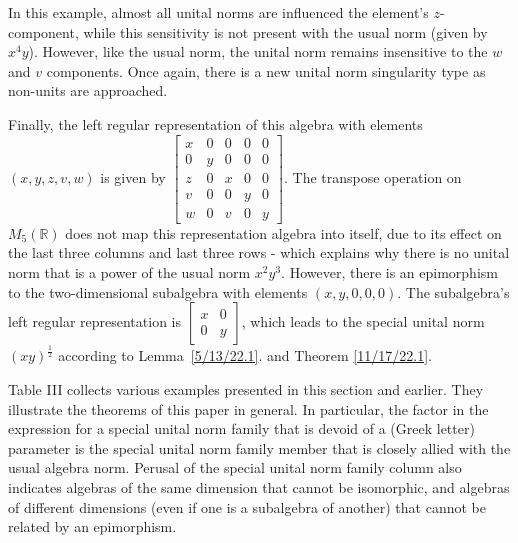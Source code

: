 \documentclass{amsart}
\numberwithin{equation}{section}
\theoremstyle{definition}
\numberwithin{theorem}{section}
\begin{document}
In this example, almost all unital norms are influenced the element's $z$-component, while this sensitivity is not present with the usual norm (given by $x^4y$).  However, like the usual norm,  the unital norm remains insensitive to the $w$ and $v$ components.  Once again, there is a new unital norm singularity type as non-units are approached.  

Finally, the left regular representation of this algebra with elements $(x,y,z,v,w)$ is given by $ \left[
\begin{array}{ccccc}
x & 0 & 0 & 0 & 0   \\
0 & y & 0 & 0 & 0 \\
z & 0 &  x & 0 & 0  \\
v & 0 &  0 & y & 0  \\
w & 0 &  v & 0 & y
\end{array}
\right].$ 
The transpose operation on $M_5(\mathbb{R})$ does not map this representation algebra into itself, due to its effect on the last three columns and last three rows - which explains why there is no unital norm that is a power of the usual norm $x^2y^3$.  However, there is an epimorphism to the two-dimensional subalgebra with elements $(x,y,0,0,0)$.  The subalgebra's left regular representation is $\left[\begin{array}{ccc}
x & 0  \\
 0 & y  
\end{array} \right]$, which leads to the special unital norm $(xy)^\frac{1}{2}$ according to \mbox{Lemma \ref{5/13/22.1}}.  and Theorem \ref{11/17/22.1}.

\vspace{.5cm}

Table III collects various examples presented in this section and earlier.  They illustrate the theorems of this paper in general. 
In particular, the factor in the expression for a special unital norm family that is devoid of a (Greek letter) parameter is the special unital norm family member that is closely allied with the usual algebra norm.   Perusal of the special unital norm family column also indicates algebras of the same dimension that cannot be isomorphic, and algebras of different dimensions (even if one is a subalgebra of another) that cannot be related by an epimorphism.
\end{document}
